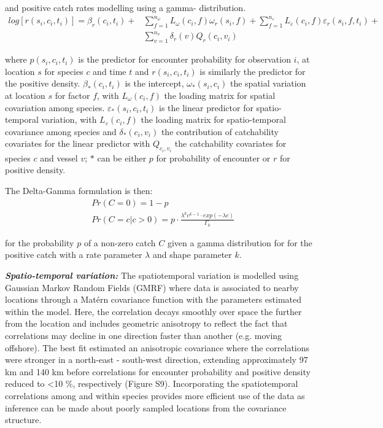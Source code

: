 \documentclass{nature}
\begin{document}
and positive catch rates modelling using a gamma- distribution\cite{Thorson2015a}. 
		\begin{equation}
			\begin{split}
			log[r(s_{i},c_{i},t_{i})] = \beta_{r}(c_{i},t_{i}) +
			& \sum\limits_{f=1}^{n_{\omega}} L_{\omega}(c_{i},f)
			\omega_{r}(s_{i},f) +\sum\limits_{f=1}^{n_{\varepsilon}} 
			L_{\varepsilon}(c_{i},f) \varepsilon_{r}(s_{i},f,t_{i}) + \\
			& \sum\limits_{v=1}^{n_{v}}\delta_{r}(v) Q_{r}(c_{i}, v_{i})
			\end{split}
		\end{equation}

where $p(s_{i}, c_{i}, t_{i})$ is the predictor for encounter probability for
observation $i$, at location $s$ for species $c$ and time $t$ and $r(s_{i},
c_{i}, t_{i})$ is similarly the predictor for the positive density.
$\beta_{*}(c_{i},t_{i})$ is the intercept, $\omega_{*}(s_{i},c_{i})$ the
spatial variation at location $s$ for factor $f$, with $L_{\omega}(c_{i},f)$
the loading matrix for spatial covariation among species.
$\varepsilon_{*}(s_{i},c_{i},t_{i})$ is the linear predictor for
spatio-temporal variation, with $L_{\varepsilon}(c_{i}, f)$ the loading matrix
for spatio-temporal covariance among species and $\delta_{*}(c_{i}, v_{i})$ the
contribution of catchability covariates for the linear predictor with
$Q_{c_{i}, v_{i}}$ the catchability covariates for species $c$ and vessel $v$;
$*$ can be either $p$ for probability of encounter or $r$ for positive density.

The Delta-Gamma formulation is then:
\begin{equation}
	\begin{split}
	& Pr(C = 0) = 1 - p \\
	& Pr(C = c | c > 0) = p \cdot \frac{\lambda^{k}c^{k-1} \cdot exp(-\lambda c)}{\Gamma_{k}}
	\end{split}
\end{equation}

for the probability $p$ of a non-zero catch $C$ given a gamma distribution for
for the positive catch with a rate parameter $\lambda$ and shape parameter $k$.

\textbf{\textit{Spatio-temporal variation:}} The spatiotemporal variation is
modelled using Gaussian Markov Random Fields (GMRF) where data is associated to
nearby locations through a Matérn covariance function with the parameters
estimated within the model. Here, the correlation decays smoothly over space
the further from the location and includes geometric anisotropy to reflect the
fact that correlations may decline in one direction faster than another (e.g.
moving offshore)\cite{Thorson2013}.  The best fit estimated an anisotropic
covariance where the correlations were stronger in a north-east - south-west
direction, extending approximately 97 km and 140 km before correlations for
encounter probability and positive density reduced to \textless 10 \%,
respectively (Figure S9).  Incorporating the spatiotemporal correlations among
and within species provides more efficient use of the data as inference
can be made about poorly sampled locations from the covariance structure.
\end{document}
